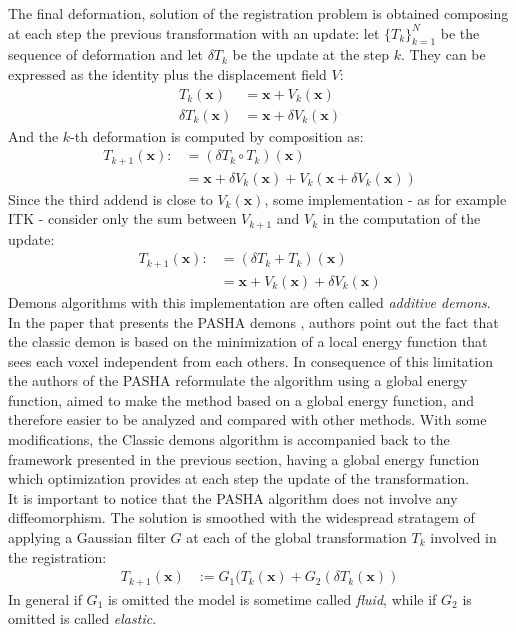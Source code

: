 The final deformation, solution of the registration problem is obtained composing at each step the previous transformation with an update: let $\{T_{k}\}_{k=1}^{N}$ be the sequence of deformation and let $\delta T_{k}$ be the update at the step $k$. They can be expressed as the identity plus the displacement field $V$:
\begin{align*}
	T_{k}(\mathbf{x}) &= \mathbf{x} + V_{k}(\mathbf{x}) \\ 
	\delta T_{k}(\mathbf{x}) &= \mathbf{x} + \delta V_{k}(\mathbf{x}) 
\end{align*}
And the $k$-th deformation is computed by composition as:
\begin{align*}
T_{k+1}(\mathbf{x})  :&= (\delta T_{k}\circ T_{k})(\mathbf{x}) \\
&= \mathbf{x} + \delta V_{k}(\mathbf{x}) + V_{k}(\mathbf{x} + \delta V_{k}(\mathbf{x}))
\end{align*}
Since the third addend is close to $V_{k}(\mathbf{x})$, some implementation - as for example ITK - consider only the sum between 
$ V_{k+1}$ and $V_{k}$ in the computation of the update:
\begin{align*}
T_{k+1}(\mathbf{x})  :&= (\delta T_{k} + T_{k})(\mathbf{x}) \\
&= \mathbf{x} + V_{k}(\mathbf{x}) + \delta V_{k}(\mathbf{x})
\end{align*}
Demons algorithms with this implementation are often called \emph{additive demons}.\\

In the paper that presents the PASHA demons \cite{cachier2003iconic}, authors point out the fact that the classic demon is based on the minimization of a local energy function that sees each voxel independent from each others. In consequence of this limitation the authors of the PASHA reformulate the algorithm using a global energy function, aimed to make the method based on a global energy function, and therefore easier to be analyzed and compared with other methods. With some modifications, the Classic demons algorithm is accompanied back to the framework presented in the previous section, having a global energy function which optimization provides at each step the update of the transformation. \\

It is important to notice that the PASHA algorithm does not involve any diffeomorphism. The solution is smoothed with the widespread stratagem of applying a Gaussian filter $G$ at each of the global transformation $T_{k}$ involved in the registration:
\begin{align*}
T_{k+1}(\mathbf{x})  &:= G_{1}(T_{k}(\mathbf{x}) + G_{2}(\delta T_{k}(\mathbf{x}))
\end{align*}
In general if $G_{1}$ is omitted the model is sometime called \emph{fluid}, while if $G_{2}$ is omitted is called \emph{elastic}.\\

